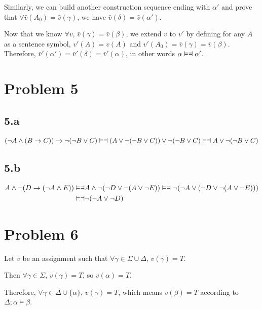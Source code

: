 \documentclass{article}
\newcommand \logequiv						{\vDash\mathrel{\text{\reflectbox{$\vDash$}}}}
\begin{document}
Similarly, we can build another construction sequence ending with $\alpha'$ and prove that $\forall \bar{v}(A_0)=\bar{v}(\gamma)$, we have $\bar{v}(\delta)=\bar{v}(\alpha')$.

Now that we know $\forall v$, $\bar{v}(\gamma) = \bar{v}(\beta)$, we extend $v$ to $v'$ by defining for any $A$ as a sentence symbol, $v'(A)=v(A)$ and $v'(A_0)=\bar{v}(\gamma)=\bar{v}(\beta)$. Therefore, $\bar{v}'(\alpha')=\bar{v}'(\delta)=\bar{v}'(\alpha)$, in other words $\alpha \logequiv \alpha'$.

\section*{Problem 5}

\subsection*{5.a}

\begin{align*}
(\neg A \land (B \to C)) \to \neg(\neg B \lor C)
\logequiv (A \lor \neg (\neg B \lor C)) \lor \neg (\neg B \lor C)
\logequiv A \lor \neg ( \neg B \lor C )
\end{align*}

\subsection*{5.b}

\begin{align*}
A \land \neg (D \to (\neg A \land E))
\logequiv & A \land \neg ( \neg D \lor \neg ( A \lor \neg E ))
\logequiv \neg ( \neg A \lor ( \neg D \lor \neg ( A \lor \neg E)))
\\
\logequiv & \neg ( \neg A \lor \neg D )
\end{align*}

\section*{Problem 6}

Let $v$ be an assignment such that $\forall \gamma \in \Sigma \cup \Delta$, $v(\gamma)=T$.

Then $\forall \gamma \in \Sigma$, $v(\gamma)=T$, so $v(\alpha)=T$.

Therefore, $\forall \gamma \in \Delta \cup \{\alpha\}$, $v(\gamma)=T$, which means $v(\beta)=T$ according to $\Delta; \alpha \vDash \beta$.
\end{document}
